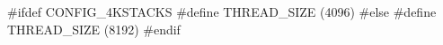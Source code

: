 \documentclass[varwidth=14em,crop]{standalone}
\begin{document}
\begin{ccode}
#ifdef CONFIG_4KSTACKS
#define THREAD_SIZE (4096)
#else
#define THREAD_SIZE (8192)
#endif  
\end{ccode}
\end{document}
